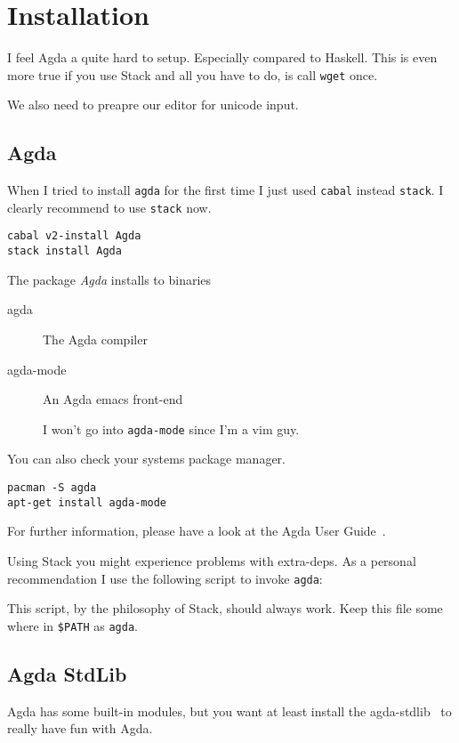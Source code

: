\documentclass[12pt]{article}
\begin{document}
\section{Installation}
I feel Agda a quite hard to setup. Especially compared to Haskell. This is even
more true if you use Stack and all you have to do, is call \verb+wget+ once.

We also need to preapre our editor for unicode input.

\subsection{Agda}
When I tried to install \verb+agda+ for the first time I just used \verb+cabal+
instead \verb+stack+. I clearly recommend to use \verb+stack+ now.

\begin{lstlisting}
cabal v2-install Agda
stack install Agda
\end{lstlisting}

The package \emph{Agda} installs to binaries

\begin{description}
	\item[agda] The Agda compiler
	\item[agda-mode] An Agda emacs front-end

		I won't go into \verb+agda-mode+ since I'm a vim guy.
\end{description}

You can also check your systems package manager.
\begin{lstlisting}
pacman -S agda
apt-get install agda-mode
\end{lstlisting}

For further information, please have a look at the Agda User
Guide~\cite{agda-user-guide}.

Using Stack you might experience problems with extra-deps. As a personal
recommendation I use the following script to invoke \verb+agda+:

This script, by the philosophy of Stack, should always work.
Keep this file some where in \verb+$PATH+ as \verb+agda+.

\subsection{Agda StdLib}
Agda has some built-in modules, but you want at least install
the agda-stdlib~\cite{agda-stdlib} to really have fun with Agda.
\end{document}
